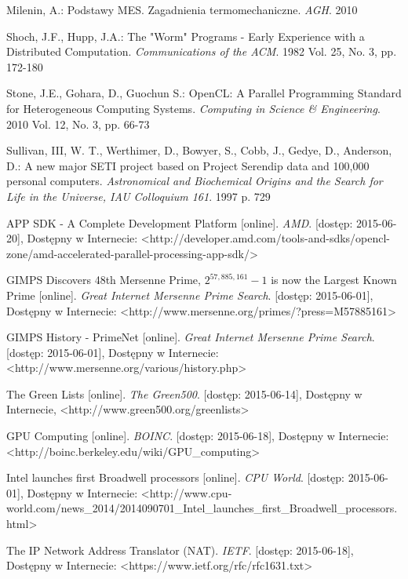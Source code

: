 \documentclass[12pt,a4paper,twoside]{article}
\begin{document}
\begin{thebibliography}{99}
 Milenin, A.: Podstawy MES. Zagadnienia termomechaniczne. \textit{AGH}. 2010

 Shoch, J.F., Hupp, J.A.: The "Worm" Programs - Early Experience with a Distributed Computation. \textit{Communications of the ACM}. 1982 Vol. 25, No. 3, pp. 172-180  

 Stone, J.E., Gohara, D., Guochun S.: OpenCL: A Parallel Programming Standard for Heterogeneous Computing Systems. \textit{Computing in Science \& Engineering}. 2010 Vol. 12, No. 3, pp. 66-73

 Sullivan, III, W. T., Werthimer, D., Bowyer, S., Cobb, J., Gedye, D., Anderson, D.: A new major SETI project based on Project Serendip data and 100,000 personal computers. \textit{Astronomical and Biochemical Origins and the Search for Life in the Universe, IAU Colloquium 161}. 1997 p. 729  


 APP SDK - A Complete Development Platform [online]. \textit{AMD}. [dostęp: 2015-06-20], Dostępny w Internecie: <http://developer.amd.com/tools-and-sdks/opencl-zone/amd-accelerated-parallel-processing-app-sdk/>

 GIMPS Discovers 48th Mersenne Prime, $2^{57,885,161}-1$ is now the Largest Known Prime [online].\textit{ Great Internet Mersenne Prime Search}. [dostęp: 2015-06-01], Dostępny w Internecie: <http://www.mersenne.org/primes/?press=M57885161>

 GIMPS History - PrimeNet [online].\textit{ Great Internet Mersenne Prime Search}. [dostęp: 2015-06-01], Dostępny w Internecie: <http://www.mersenne.org/various/history.php>

 The Green Lists [online]. \textit{The Green500}. [dostęp: 2015-06-14], Dostępny w Internecie, <http://www.green500.org/greenlists>

 GPU Computing [online]. \textit{BOINC}. [dostęp: 2015-06-18], Dostępny w Internecie: <http://boinc.berkeley.edu/wiki/GPU\_computing>

 Intel launches first Broadwell processors [online]. \textit{CPU World}. [dostęp: 2015-06-01], Dostępny w Internecie: <http://www.cpu-world.com/news\_2014/2014090701\_Intel\_launches\_first\_Broadwell\_processors.html>

 The IP Network Address Translator (NAT). \textit{IETF}. [dostęp: 2015-06-18], Dostępny w Internecie: <https://www.ietf.org/rfc/rfc1631.txt>


\end{thebibliography}
\end{document}
